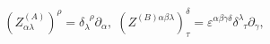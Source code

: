 \begin{equation}
\left( Z_{\alpha \lambda }^{(A)}\right) ^{\rho }=\delta _{\lambda
}^{\;\;\rho }\partial _{\alpha },\;\left( Z^{(B)\alpha \beta \lambda
}\right) _{\tau }^{\delta }=\varepsilon ^{\alpha \beta \gamma \delta }\delta
_{\;\;\tau }^{\lambda }\partial _{\gamma },  \label{cin34}
\end{equation}


